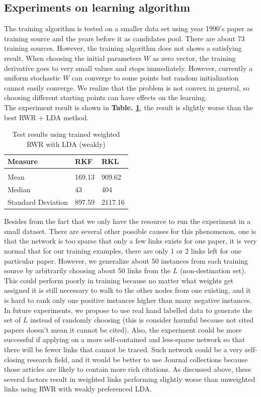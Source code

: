 \documentclass{article} %
\begin{document}
\subsection{Experiments on learning algorithm}
\label{sec:learning}
The training algorithm is tested on a smaller data set using year 1990's paper as training source and the years before it as candidates pool. There are about 73 training sources. However, the training algorithm does not shows a satisfying result. When choosing the initial parameters $W$ as zero vector, the training derivative goes to very small values and stops immediately. However, currently a uniform stochastic $W$ can converge to some points but random initialization cannot easily converge. We realize that the problem is not convex in general, so choosing different starting points can have effects on the learning. \\
The experiment result is shown in \textbf{Table. \ref{trained-test}}, the result is slightly worse than the best RWR + LDA method.\\
\begin{table}[t]
\caption{Test results using trained weighted RWR with LDA (weakly)}
\label{trained-test}
\begin{center}
\begin{tabular}{lll}
\bf Measure & \bf RKF & \bf RKL\\
\hline \\
Mean & 169.13 & 909.62\\
Median & 43 & 404\\
Standard Deviation & 897.59 & 2117.16\\
\end{tabular}
\end{center}
\end{table}
Besides from the fact that we only have the resource to run the experiment in a small dataset. There are several other possible causes for this phenomenon, one is that the network is too sparse that only a few links exists for one paper, it is very normal that for our training examples, there are only 1 or 2 links left for one particular paper. However, we generalize about 50 instances from each training source by arbitrarily choosing about 50 links from the $L$ (non-destination set). This could perform poorly in training because no matter what weights get assigned it is still necessary to walk to the other nodes from one existing, and it is hard to rank only one positive instances higher than many negative instances.\\
In future experiments, we propose to use real hand labelled data to generate the set of $L$ instead of randomly choosing (this is consider harmful because not cited papers doesn't mean it cannot be cited). Also, the experiment could be more successful if applying on a more self-contained and less-sparse network so that there will be fewer links that cannot be traced. Such network could be a very self-closing research field, and it would be better to use Journal collections because those articles are likely to contain more rich citations.
As discussed above, these several factors result in weighted links performing slightly worse than unweighted links using RWR with weakly preferenced LDA.
\end{document}
